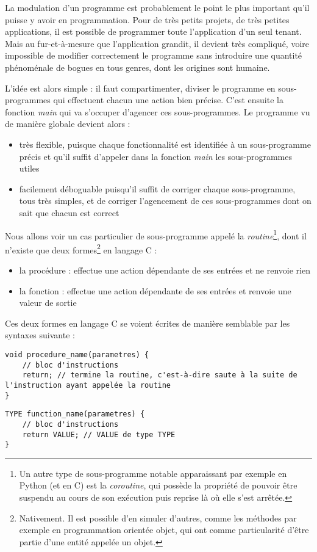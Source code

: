 \documentclass[../../../main.tex]{subfiles}
\begin{document}
La modulation d'un programme est probablement le point le plus important qu'il puisse y avoir en programmation. Pour de très petits projets, de très petites applications, il est possible de programmer toute l'application d'un seul tenant. Mais au fur-et-à-mesure que l'application grandit, il devient très compliqué, voire impossible de modifier correctement le programme sans introduire une quantité phénoménale de bogues en tous genres, dont les origines sont humaine.

L'idée est alors simple : il faut compartimenter, diviser le programme en sous-programmes qui effectuent chacun une action bien précise. C'est ensuite la fonction \textit{main} qui va s'occuper d'agencer ces sous-programmes. Le programme vu de manière globale devient alors :
\begin{itemize}
	\item très flexible, puisque chaque fonctionnalité est identifiée à un sous-programme précis et qu'il suffit d'appeler dans la fonction \textit{main} les sous-programmes utiles
	\item facilement déboguable puisqu'il suffit de corriger chaque sous-programme, tous très simples, et de corriger l'agencement de ces sous-programmes dont on sait que chacun est correct
\end{itemize}
Nous allons voir un cas particulier de sous-programme appelé la \textit{routine}\footnote{Un autre type de sous-programme notable apparaissant par exemple en Python 	(et en C) est la \textit{coroutine}, qui possède la propriété de pouvoir être suspendu au cours de son exécution puis reprise là où elle s'est arrêtée.}, dont il n'existe que deux formes\footnote{Nativement. Il est possible d'en simuler d'autres, comme les méthodes par exemple en programmation orientée objet, qui ont comme particularité d'être partie d'une entité appelée un objet.} en langage C :
\begin{itemize}
	\item la procédure : effectue une action dépendante de ses entrées et ne renvoie rien
	\item la fonction : effectue une action dépendante de ses entrées et renvoie une valeur de sortie
\end{itemize}
Ces deux formes en langage C se voient écrites de manière semblable par les syntaxes suivante :

\begin{minipage}{0.5\textwidth}
\begin{verbatim}
void procedure_name(parametres) {
	// bloc d'instructions
	return; // termine la routine, c'est-à-dire saute à la suite de l'instruction ayant appelée la routine
}
\end{verbatim}
\end{minipage}
\begin{minipage}{0.5\textwidth}
\begin{verbatim}
TYPE function_name(parametres) {
	// bloc d'instructions
	return VALUE; // VALUE de type TYPE
}
\end{verbatim}
\end{minipage}
 
\end{document}
